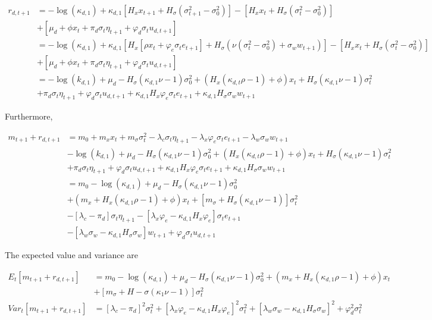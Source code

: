 \documentclass{article}
\begin{document}
\begin{enumerate}
\begin{align*}
r_{d,t+1} 
&= - \log(\kappa_{d,1}) + \kappa_{d,1} [H_x x_{t+1} + H_\sigma(\sigma_{t+1}^2 - \sigma_0^2)] - [H_x x_t + H_\sigma(\sigma_t^2 - \sigma_0^2)] \\
&+ [\mu_d + \phi x_t + \pi_d \sigma_t \eta_{t+1} + \varphi_d \sigma_t u_{d,t+1}]\\
&= - \log(\kappa_{d,1}) + \kappa_{d,1} [H_x [\rho x_t + \varphi_e \sigma_t e_{t+1}]+ H_\sigma(\nu(\sigma_t^2 - \sigma_0^2) + \sigma_w w_{t+1})] - [H_x x_t + H_\sigma(\sigma_t^2 - \sigma_0^2)] \\
&+ [\mu_d + \phi x_t + \pi_d \sigma_t \eta_{t+1} + \varphi_d \sigma_t u_{d,t+1}]\\
&= -\log(k_{d,1}) + \mu_d - H_\sigma (\kappa_{d,1} \nu - 1) \sigma_0^2 + (H_x(\kappa_{d,t} \rho - 1) + \phi) x_t + H_\sigma(\kappa_{d,1} \nu - 1) \sigma_t^2 \\
&+ \pi_d \sigma_t \eta_{t+1} + \varphi_d  \sigma_t u_{d,t+1} + \kappa_{d,1} H_x \varphi_e \sigma_t e_{t+1} + \kappa_{d,1} H_\sigma \sigma_w w_{t+1}
\end{align*}


Furthermore,

\begin{align*}
m_{t+1} + r_{d,t+1} 
&= m_0 + m_x x_t + m_\sigma \sigma_t^2 - \lambda_c \sigma_t \eta_{t+1} - \lambda_x\varphi_e \sigma_t e_{t+1} - \lambda_w\sigma_w w_{t+1} \\
&-\log(k_{d,1}) + \mu_d - H_\sigma (\kappa_{d,1} \nu - 1) \sigma_0^2 + (H_x(\kappa_{d,t} \rho - 1) + \phi) x_t + H_\sigma(\kappa_{d,1} \nu - 1) \sigma_t^2 \\
&+ \pi_d \sigma_t \eta_{t+1} + \varphi_d  \sigma_t u_{d,t+1} + \kappa_{d,1} H_x \varphi_e \sigma_t e_{t+1} + \kappa_{d,1} H_\sigma \sigma_w w_{t+1} \\
&= m_0 - \log(\kappa_{d,1}) + \mu_d - H_\sigma(\kappa_{d,1}\nu - 1) \sigma_0^2 \\
&+ (m_x + H_x (\kappa_{d,1} \rho - 1) + \phi) x_t +[m_\sigma + H_\sigma(\kappa_{d,1} \nu - 1)] \sigma_t^2 \\
&- [\lambda_c - \pi_d]\sigma_t \eta_{t+1} - [\lambda_x\varphi_e - \kappa_{d,1} H_x \varphi_e] \sigma_t e_{t+1} \\
&- [\lambda_w\sigma_w - \kappa_{d,1} H_\sigma \sigma_w]w_{t+1} + \varphi_d \sigma_t u_{d,t+1}
\end{align*}

The expected value and variance are

\begin{align*}
E_t[m_{t+1} + r_{d,t+1}] &= m_0 - \log(\kappa_{d,1}) + \mu_d - H_\sigma(\kappa_{d,1} \nu - 1) \sigma^2_0 + (m_x + H_x (\kappa_{d,1} \rho - 1) + \phi) x_t \\
&+ [m_\sigma + H-\sigma(\kappa_1 \nu - 1)] \sigma_t^2\\
Var_t[m_{t+1} + r_{d,t+1}] &= [\lambda_c - \pi_d]^2 \sigma_t^2 + [\lambda_x\varphi_e - \kappa_{d,1} H_x \varphi_e]^2 \sigma_t^2 + [\lambda_w\sigma_w - \kappa_{d,1} H_\sigma \sigma_w]^2 + \varphi_d^2 \sigma_t^2
\end{align*}


\end{enumerate}
\end{document}
